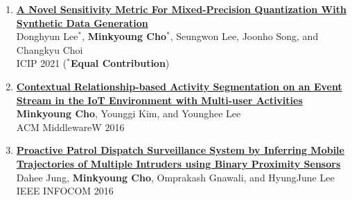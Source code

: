 \documentclass[letterpaper,oneside,11pt]{article}
\begin{document}
\begin{enumerate}[leftmargin=*, itemsep=0em]
  \textbf{Minkyoung Cho} and Kang G. Shin\\
  arXiv 2023
  \item \small \textbf{\href{https://ieeexplore.ieee.org/abstract/document/9506527}{A Novel Sensitivity Metric For Mixed-Precision Quantization With Synthetic Data Generation}}\\
  Donghyun Lee$^\ast$, \textbf{Minkyoung Cho$^\ast$}, Seungwon Lee, Joonho Song, and Changkyu Choi \\
  ICIP 2021 ($^\ast$\textbf{Equal Contribution})
  \item \small \textbf{\href{https://dl.acm.org/doi/10.1145/3008631.3008633}{Contextual Relationship-based Activity Segmentation on an Event Stream in the IoT Environment with Multi-user Activities}}\\
  \textbf{Minkyoung Cho}, Younggi Kim, and Younghee Lee\\
  ACM MiddlewareW 2016
  \item \small \textbf{\href{https://ieeexplore.ieee.org/abstract/document/7524369}{Proactive Patrol Dispatch Surveillance System by Inferring Mobile Trajectories of Multiple Intruders using Binary Proximity Sensors}}\\
  Dahee Jung, \textbf{Minkyoung Cho}, Omprakash Gnawali, and HyungJune Lee\\  
  IEEE INFOCOM 2016
\end{enumerate}

\end{document}
